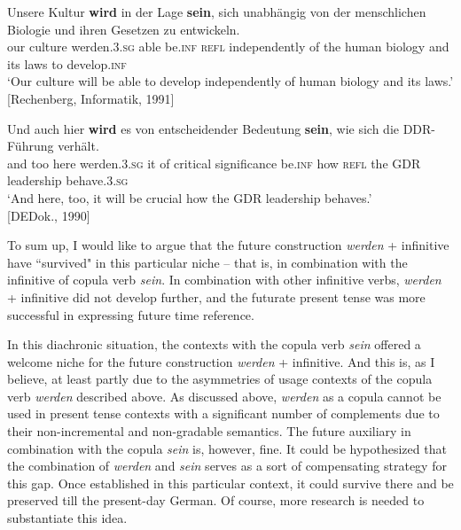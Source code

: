 \documentclass[output=paper,colorlinks,citecolor=brown]{langscibook}
\begin{document}
\ea\label{ex:smirnova:35}
\gll Unsere Kultur \textbf{wird} {in der Lage} \textbf{sein}, sich unabhängig von der menschlichen Biologie und ihren Gesetzen zu entwickeln.\\
    our culture werden.\textsc{3.sg} {able} be.\textsc{inf} \textsc{refl} independently of the human biology and its laws to develop.\textsc{inf}\\
\glt `Our culture will be able to develop independently of human biology and its laws.'\\
\hfill [Rechenberg, Informatik, 1991]
\z

\ea\label{ex:smirnova:36}
\gll Und auch hier \textbf{wird} es von entscheidender Bedeutung \textbf{sein}, wie sich die DDR-Führung verhält.\\
    and too here werden.\textsc{3.sg} it of critical significance be.\textsc{inf} how \textsc{refl} the {GDR leadership} behave.\textsc{3.sg}\\
\glt `And here, too, it will be crucial how the GDR leadership behaves.'\\
\hfill [DEDok., 1990]
\z

To sum up, I would like to argue that the future construction \textit{werden} + infinitive have ``survived" in this particular niche -- that is, in combination with the infinitive of copula verb \textit{sein}. In combination with other infinitive verbs, \textit{werden} + infinitive did not develop further, and the futurate present tense was more successful in expressing future time reference. 
\par In this diachronic situation, the contexts with the copula verb \textit{sein} offered a welcome niche for the future construction \textit{werden} + infinitive. And this is, as I believe, at least partly due to the asymmetries of usage contexts of the copula verb \textit{werden} described above. As discussed above, \textit{werden} as a copula cannot be used in present tense contexts with a significant number of complements due to their non-incremental and non-gradable semantics. The future auxiliary in combination with the copula \textit{sein} is, however, fine. It could be hypothesized that the combination of \textit{werden} and \textit{sein} serves as a sort of compensating strategy for this gap. Once established in this particular context, it could survive there and be preserved till the present-day German. Of course, more research is needed to substantiate this idea.
\end{document}
